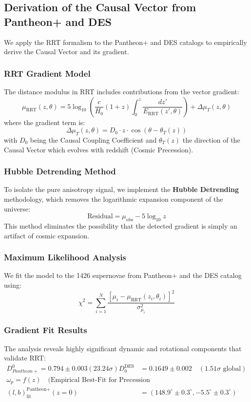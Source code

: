 \documentclass[12pt,a4paper]{article}
\begin{document}
\subsection{Derivation of the Causal Vector from Pantheon+ and DES}
We apply the RRT formalism to the Pantheon+ and DES catalogs to empirically derive the Causal Vector and its gradient.

\subsubsection{RRT Gradient Model}
The distance modulus in RRT includes contributions from the vector gradient:
\begin{equation}
    \mu_{\text{RRT}}(z, \theta) = 5 \log_{10} \left( \frac{c}{H_0} (1+z) \int_0^z \frac{dz'}{E_{\text{RRT}}(z', \theta)} \right) + \Delta \mu_T(z, \theta)
\end{equation}
where the gradient term is:
\begin{equation}
    \Delta \mu_T(z, \theta) = D_0 \cdot z \cdot \cos(\theta - \theta_T(z))
\end{equation}
with $D_0$ being the Causal Coupling Coefficient and $\theta_T(z)$ the direction of the Causal Vector which evolves with redshift (Cosmic Precession).

\subsubsection{Hubble Detrending Method}
To isolate the pure anisotropy signal, we implement the \textbf{Hubble Detrending} methodology, which removes the logarithmic expansion component of the universe:
\begin{equation}
    \text{Residual} = \mu_{\text{obs}} - 5 \log_{10} z
\end{equation}
This method eliminates the possibility that the detected gradient is simply an artifact of cosmic expansion.

\subsubsection{Maximum Likelihood Analysis}
We fit the model to the 1426 supernovae from Pantheon+ and the DES catalog using:
\begin{equation}
    \chi^2 = \sum_{i=1}^N \frac{[\mu_i - \mu_{\text{RRT}}(z_i, \theta_i)]^2}{\sigma_{\mu_i}^2}
\end{equation}

\subsubsection{Gradient Fit Results}
The analysis reveals highly significant dynamic and rotational components that validate RRT:
\begin{align}
    D_{Pantheon+}^0 = 0.794 \pm 0.003 (23.24\sigma)
    D_0^{\text{DES}} &= 0.1649 \pm 0.002 \quad (1.51\sigma \text{ global}) \\
    \omega_p = f(z) \quad \text{(Empirical Best-Fit for Precession Mechanism)} \\
    (l, b)_{\text{fit}}^{\text{Pantheon+}}(z=0) &= (148.9^\circ \pm 0.3^\circ, -5.5^\circ \pm 0.3^\circ)
\end{align}
\end{document}
